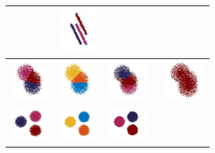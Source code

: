 \documentclass[12pt]{drexelthesis}
\begin{document}
\begin{table}[h!]
\begin{tabular}{ | c | c | c | c | c | }
      &
             \includegraphics[trim={0 1cm 0 1cm},clip, width=1.5cm]{2d-cluster-tests/euclidean-distance/lines.jpg}    
      \\ \hline
      
           \includegraphics[trim={0 1cm 0 1cm},clip,width=1.5cm]{2d-cluster-tests/k-means/blob.jpg}
      & 
           \includegraphics[trim={0 0cm 0 0cm},clip,width=1.5cm]{2d-cluster-tests/fcm/blob.jpg} 
      & 
           \includegraphics[trim={0 1cm 0 1cm},clip,width=1.5cm]{2d-cluster-tests/agglomerative/blob.jpg} 
      &

      &
           \includegraphics[trim={0 0.5cm 0 0.25cm},clip,width=1.5cm]{2d-cluster-tests/euclidean-distance/blob.jpg} 
      \\ \hline
      
            \includegraphics[width=1.5cm]{2d-cluster-tests/k-means/solid_circles.jpg}
      & 
            \includegraphics[width=1.5cm]{2d-cluster-tests/fcm/circles.jpg}
      & 
            \includegraphics[width=1.5cm]{2d-cluster-tests/agglomerative/solid_circles.jpg}
      &


\end{tabular}
\end{table}
\end{document}

